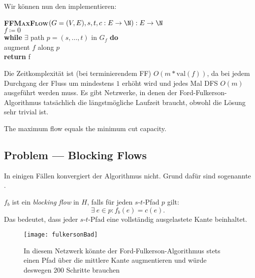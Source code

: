 Wir können nun den  implementieren:

\begin{pseudocode}
  \textbf{\textsc{FFMaxFlow}}\( (G = (V,E), s, t, c: E \to \N) : E \to \N \) \\
  \phantom{\enskip} \( f \coloneqq 0 \) \\
  \phantom{\enskip} \textbf{while} \( \exists \) path \( p = (s,\dots,t) \) in \( G_f \) \textbf{do} \\
  \phantom{\enskip} \phantom{\enskip} augment \( f \) along \( p \) \\
  \phantom{\enskip} \textbf{return} f
\end{pseudocode}

Die Zeitkomplexität ist (bei terminierendem FF) \( O(m*\text{val}(f)) \), da bei jedem Durchgang der Fluss um mindestens \( 1 \) erhöht wird und jedes Mal DFS \( O(m) \) ausgeführt werden muss. Es gibt Netzwerke, in denen der Ford-Fulkerson-Algorithmus tatsächlich die längstmögliche Laufzeit braucht, obwohl die Lösung sehr trivial ist. 

The maximum flow equals the minimum cut capacity.

\subsection{Problem --- Blocking Flows}

\begin{minipage}{.6\textwidth}
  
  In einigen Fällen konvergiert der Algorithmus nicht. Grund dafür sind sogenannte .

  \( f_b \) ist ein \emph{blocking flow} in \( H \), falls für jeden \( s \)-\( t \)-Pfad \( p \) gilt:
  \begin{equation*}
    \exists \ e \in p : f_b(e) = c(e)\text{.}
  \end{equation*}
  Das bedeutet, dass jeder \( s \)-\( t \)-Pfad eine vollständig ausgelastete Kante beinhaltet.
\end{minipage}
\hfill
\begin{minipage}{.35\textwidth}
  \begin{figure}[H]
    \texttt{[image: fulkersonBad]}
    \caption{In diesem Netzwerk könnte der Ford-Fulkerson-Algorithmus stets einen Pfad über die mittlere Kante augmentieren und würde deswegen 200 Schritte brauchen}
  \end{figure}
\end{minipage}

